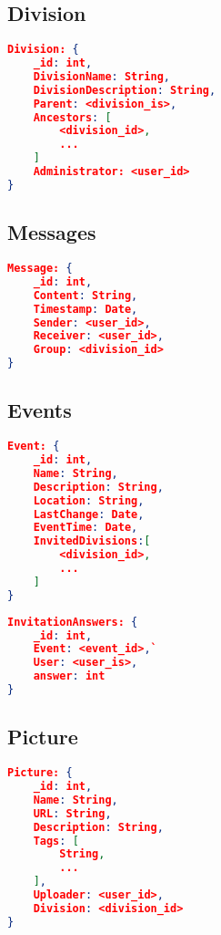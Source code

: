 \subsection{Division}
\begin{lstlisting}[language=json, caption=\emph{Division}-document store]
Division: {
    _id: int,  
    DivisionName: String,
    DivisionDescription: String,
    Parent: <division_is>,
    Ancestors: [
        <division_id>,
        ...
    ]
    Administrator: <user_id>
}
\end{lstlisting}

\subsection{Messages}
\begin{lstlisting}[language=json, caption=\emph{Message}-document store]
Message: {
    _id: int,  
    Content: String,
    Timestamp: Date,
    Sender: <user_id>,
    Receiver: <user_id>,
    Group: <division_id>
}
\end{lstlisting}

\subsection{Events}
\begin{lstlisting}[language=json, caption=\emph{Event}-document store]
Event: {
    _id: int,  
    Name: String,
    Description: String,
    Location: String,
    LastChange: Date,
    EventTime: Date,
    InvitedDivisions:[
        <division_id>,
        ...
    ]
}
\end{lstlisting}

\begin{lstlisting}[language=json, caption=\emph{InvitationAnswers}-document store]
InvitationAnswers: {
    _id: int,  
    Event: <event_id>,`
    User: <user_is>,
    answer: int
}
\end{lstlisting}

\subsection{Picture}

\begin{lstlisting}[language=json, caption=\emph{Picture}-document store]
Picture: {
    _id: int,  
    Name: String,
    URL: String,
    Description: String,
    Tags: [
        String,
        ...
    ],
    Uploader: <user_id>,
    Division: <division_id>
}
\end{lstlisting}

